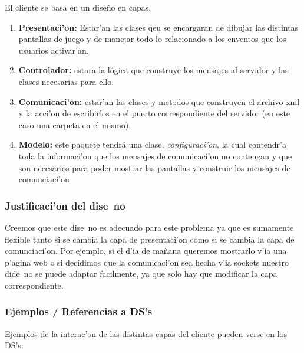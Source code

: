 El cliente se basa en un diseño en capas.


\begin{enumerate}
	\item \textbf{Presentaci'on: }Estar'an las clases qeu se encargaran de dibujar las distintas pantallas de juego y de manejar todo lo relacionado a los enventos que los usuarios activar'an.
	\item \textbf{Controlador: } estara la lógica que construye los mensajes al servidor y las clases necesarias para ello.
	\item \textbf{Comunicaci'on:} estar'an las clases y metodos que construyen el archivo xml y la acci'on de escribirlos en el puerto correspondiente del servidor (en este caso una carpeta en el mismo).
	\item  \textbf{Modelo:} este paquete tendrá una clase, \textit{configuraci'on}, la cual contendr'a toda la informaci'on que los mensajes de comunicaci'on no contengan y que son necesarios para poder mostrar las pantallas y construir los mensajes de comunciaci'on
 \end{enumerate}

\subsubsection{Justificaci'on del dise~no}
Creemos que este dise~no es adecuado para este problema ya que es sumamente flexible tanto si se cambia la capa de presentaci'on como si se cambia la capa de comunciaci'on. Por ejemplo, si el d'ia de mañana queremos mostrarlo v'ia una p'agina web o si decidimos que la comunicaci'on sea hecha v'ia sockets nuestro dide~no se puede adaptar facilmente, ya que solo hay que modificar la capa correspondiente.

\subsubsection{Ejemplos / Referencias a DS's}
Ejemplos de la interac'on de las distintas capas del cliente pueden verse en los DS's:



